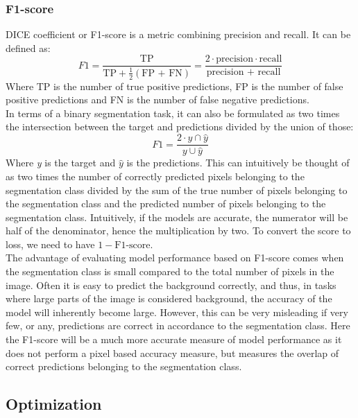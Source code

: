 \subsubsection{F1-score}
DICE coefficient or F1-score is a metric combining precision and recall. It can be defined as:
\begin{equation*}
	F1 = \frac{\text{TP}}{\text{TP}+\frac{1}{2}(\text{FP + FN})} = \frac{2\cdot\text{precision}\cdot\text{recall}}{\text{precision + recall}}
\end{equation*}
Where TP is the number of true positive predictions, FP is the number of false positive predictions and FN is the number of false negative predictions.\\
In terms of a binary segmentation task, it can also be formulated as two times the intersection between the target and predictions divided by the union of those:
\begin{equation*}
	F1 = \frac{2\cdot y \cap \hat{y}}{y\cup \hat{y}}
\end{equation*}
Where \textit{y} is the target and $\hat{y}$ is the predictions. This can intuitively be thought of as two times the number of correctly predicted pixels belonging to the segmentation class divided by the sum of the true number of pixels belonging to the segmentation class and the predicted number of pixels belonging to the segmentation class. Intuitively, if the models are accurate, the numerator will be half of the denominator, hence the multiplication by two. To convert the score to loss, we need to have $1 - \text{F1-score}$.\\
The advantage of evaluating model performance based on F1-score comes when the segmentation class is small compared to the total number of pixels in the image. Often it is easy to predict the background correctly, and thus, in tasks where large parts of the image is considered background, the accuracy of the model will inherently become large. However, this can be very misleading if very few, or any, predictions are correct in accordance to the segmentation class. Here the F1-score will be a much more accurate measure of model performance as it does not perform a pixel based accuracy measure, but measures the overlap of correct predictions belonging to the segmentation class.

\subsection{Optimization}
